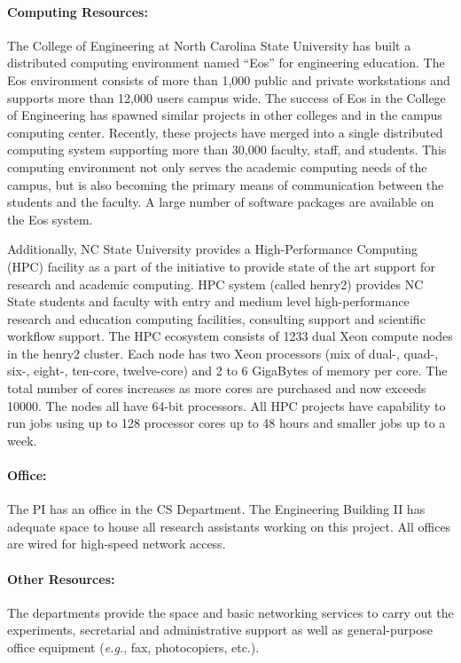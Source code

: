 \paragraph{Computing Resources:}
The College of Engineering at North Carolina State University has built
a distributed computing environment named ``Eos'' for engineering education.
The Eos environment consists of more than 1,000 public and private
workstations and supports more than 12,000 users campus wide.
The success of Eos in the College of Engineering has spawned similar
projects in other colleges and in the campus computing center. Recently,
these projects have merged into a single distributed computing system
supporting more than 30,000 faculty, staff, and students. This computing
environment not only serves the academic computing needs of the campus,
but is also becoming the primary means of communication between the students
and the faculty. A large number of software packages are available on the
Eos system.

Additionally, NC State University provides a High-Performance Computing (HPC) facility as a part of the initiative to provide state of the art support for research and academic computing. HPC system (called henry2) provides NC State students and faculty with entry and medium level high-performance research and education computing facilities, consulting support and scientific workflow support. The HPC ecosystem consists of 1233 dual Xeon compute nodes in the henry2 cluster. Each node has two Xeon processors (mix of dual-, quad-, six-, eight-, ten-core, twelve-core) and 2 to 6 GigaBytes of memory per core. The total number of cores increases as more cores are purchased and now exceeds 10000. The nodes all have 64-bit processors. All HPC projects have capability to run jobs using up to 128 processor cores up to 48 hours and smaller jobs up to a week.

\paragraph{Office:}
The PI has an
office in the CS Department.  The Engineering Building II
has adequate space to house all research assistants
working on this project. All offices are wired for high-speed network
access.

\paragraph{Other Resources:}
The departments provide the space and basic networking services to
carry out the experiments, secretarial and administrative support as
well as general-purpose office equipment ({\em e.g.}, fax, photocopiers,
etc.).


